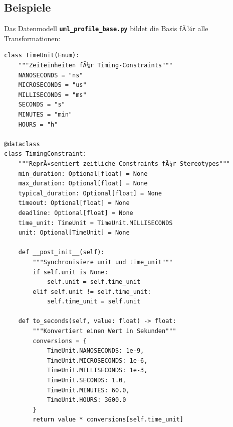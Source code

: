﻿\documentclass[a4paper,12pt]{scrreprt}
\theoremstyle{definition}
\begin{document}
\subsection{Beispiele}

Das Datenmodell \texttt{\textbf{uml\_profile\_base.py}} bildet die Basis fÃ¼r alle Transformationen:
\begin{lstlisting}[style=python, caption={TimingConstraint Klasse}, label={lst:timing-constraint}]
class TimeUnit(Enum):
    """Zeiteinheiten fÃ¼r Timing-Constraints"""
    NANOSECONDS = "ns"
    MICROSECONDS = "us"
    MILLISECONDS = "ms"
    SECONDS = "s"
    MINUTES = "min"
    HOURS = "h"

@dataclass
class TimingConstraint:
    """ReprÃ¤sentiert zeitliche Constraints fÃ¼r Stereotypes"""
    min_duration: Optional[float] = None 
    max_duration: Optional[float] = None 
    typical_duration: Optional[float] = None 
    timeout: Optional[float] = None 
    deadline: Optional[float] = None 
    time_unit: TimeUnit = TimeUnit.MILLISECONDS
    unit: Optional[TimeUnit] = None 
    
    def __post_init__(self):
        """Synchronisiere unit und time_unit"""
        if self.unit is None:
            self.unit = self.time_unit
        elif self.unit != self.time_unit:
            self.time_unit = self.unit
    
    def to_seconds(self, value: float) -> float:
        """Konvertiert einen Wert in Sekunden"""
        conversions = {
            TimeUnit.NANOSECONDS: 1e-9,
            TimeUnit.MICROSECONDS: 1e-6,
            TimeUnit.MILLISECONDS: 1e-3,
            TimeUnit.SECONDS: 1.0,
            TimeUnit.MINUTES: 60.0,
            TimeUnit.HOURS: 3600.0
        }
        return value * conversions[self.time_unit]
\end{lstlisting}
\end{document}
